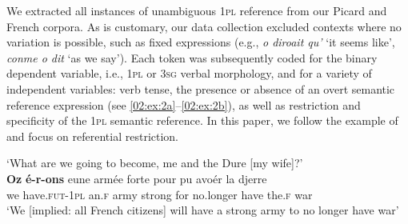 \documentclass[output=paper,colorlinks,citecolor=brown]{langscibook}
\begin{document}
We extracted all instances of unambiguous 1\textsc{pl} reference from our Picard and French corpora. As is customary, our data collection excluded contexts where no variation is possible, such as fixed expressions (e.g., \textit{o diroait qu’} ‘it seems like’, \textit{conme o dit} ‘as we say’). Each token was subsequently coded for the binary dependent variable, i.e., 1\textsc{pl} or 3\textsc{sg} verbal morphology, and for a variety of independent variables: verb tense, the presence or absence of an overt semantic reference expression (see \ref{02:ex:2a}--\ref{02:ex:2b}), as well as restriction and specificity of the 1\textsc{pl} semantic reference. In this paper, we follow the example of \citet{king_interplay_2011} and focus on referential restriction.

\ea \label{02:ex:2}
\glt ‘What are we going to become, me and the Dure [my wife]?’ \\

\ex\label{02:ex:2b} \gll \textbf{Oz} 	\textbf{é-r-ons} 	eune  armée  forte    pour  pu 		avoér  la     djerre \\
we 	have.\textsc{fut}-1\textsc{pl} 	an.\textsc{f}   army    strong  for    no.longer 	have    the.\textsc{f}  war\\
\glt ‘We [implied: all French citizens] will have a strong army to no longer have war’
\z
\z
\end{document}
